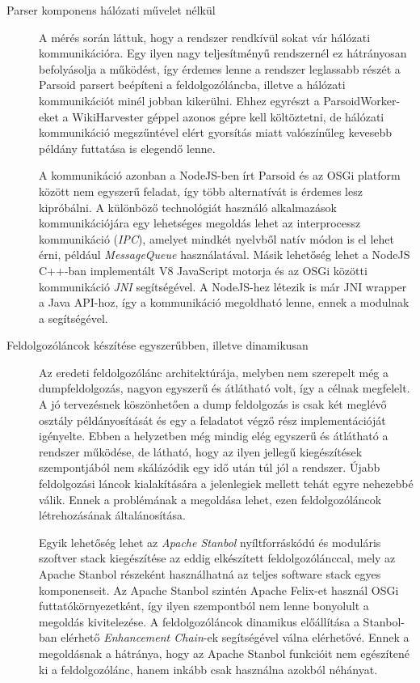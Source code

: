 \begin{description}
	\item[Parser komponens hálózati művelet nélkül]

A mérés során láttuk, hogy a rendszer rendkívül sokat vár hálózati kommunikációra. Egy ilyen nagy teljesítményű rendszernél ez hátrányosan befolyásolja a működést, így érdemes lenne a rendszer leglassabb részét a Parsoid parsert beépíteni a feldolgozóláncba, illetve a hálózati kommunikációt minél jobban kikerülni. Ehhez egyrészt a ParsoidWorker-eket a WikiHarvester géppel azonos gépre kell költöztetni, de hálózati kommunikáció megszűntével elért gyorsítás miatt valószínűleg kevesebb példány futtatása is elegendő lenne.

A kommunikáció azonban a NodeJS-ben írt Parsoid és az OSGi platform között nem egyszerű feladat, így több alternatívát is érdemes lesz kipróbálni. A különböző technológiát használó alkalmazások kommunikációjára egy lehetséges megoldás lehet az interprocessz kommunikáció (\textit{IPC}), amelyet mindkét nyelvből natív módon is el lehet érni, például \textit{MessageQueue} használatával. Másik lehetőség lehet a NodeJS C++-ban implementált V8 JavaScript motorja és az OSGi közötti kommunikáció \textit{JNI} segítségével. A NodeJS-hez létezik is már JNI wrapper a Java API-hoz, így a kommunikáció megoldható lenne, ennek a modulnak a segítségével.

    \item[Feldolgozóláncok készítése egyszerűbben, illetve dinamikusan]

Az eredeti feldolgozólánc architektúrája, melyben nem szerepelt még a dumpfeldolgozás, nagyon egyszerű és átlátható volt, így a célnak megfelelt. A jó tervezésnek köszönhetően a dump feldolgozás is csak két meglévő osztály példányosítását és egy a feladatot végző rész implementációját igényelte. Ebben a helyzetben még mindig elég egyszerű és átlátható a rendszer működése, de látható, hogy az ilyen jellegű kiegészítések szempontjából nem skálázódik egy idő után túl jól a rendszer. Újabb feldolgozási láncok kialakítására a jelenlegiek mellett tehát egyre nehezebbé válik. Ennek a problémának a megoldása lehet, ezen feldolgozóláncok létrehozásának általánosítása.
    
Egyik lehetőség lehet az \textit{Apache Stanbol} nyíltforráskódú és moduláris szoftver stack kiegészítése az eddig elkészített feldolgozólánccal, mely az Apache Stanbol részeként használhatná az teljes software stack egyes komponenseit. Az Apache Stanbol szintén Apache Felix-et használ OSGi futtatókörnyezetként, így ilyen szempontból nem lenne bonyolult a megoldás kivitelezése. A feldolgozóláncok dinamikus előállítása a Stanbol-ban elérhető \textit{Enhancement Chain}-ek segítségével válna elérhetővé. Ennek a megoldásnak a hátránya, hogy az Apache Stanbol funkcióit nem egészítené ki a feldolgozólánc, hanem inkább csak használna azokból néhányat.
    

\end{description}
